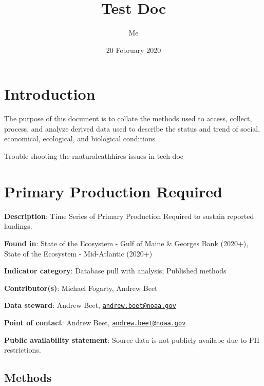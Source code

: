 \documentclass[
]{book}
\title{Test Doc}
\author{Me}
\date{20 February 2020}
\begin{document}
\maketitle

{
\setcounter{tocdepth}{1}
\tableofcontents
}
\hypertarget{introduction}{%
\chapter*{Introduction}\label{introduction}}

The purpose of this document is to collate the methods used to access, collect, process, and analyze derived data used to describe the status and trend of social, economical, ecological, and biological conditions

Trouble shooting the rnaturaleathhires issues in tech doc

\hypertarget{primary-production-required}{%
\chapter{Primary Production Required}\label{primary-production-required}}

\textbf{Description}: Time Series of Primary Production Required to sustain reported landings.

\textbf{Found in}: State of the Ecosystem - Gulf of Maine \& Georges Bank (2020+), State of the Ecosystem - Mid-Atlantic (2020+)

\textbf{Indicator category}: Database pull with analysis; Published methods

\textbf{Contributor(s)}: Michael Fogarty, Andrew Beet

\textbf{Data steward}: Andrew Beet, \href{mailto:andrew.beet@noaa.gov}{\nolinkurl{andrew.beet@noaa.gov}}

\textbf{Point of contact}: Andrew Beet, \href{mailto:andrew.beet@noaa.gov}{\nolinkurl{andrew.beet@noaa.gov}}

\textbf{Public availability statement}: Source data is not publicly availabe due to PII restrictions.

\hypertarget{methods}{%
\section{Methods}\label{methods}}
\end{document}
